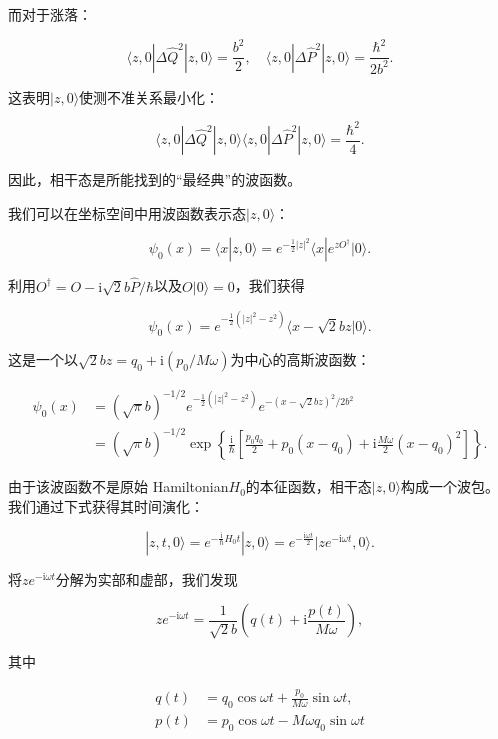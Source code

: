而对于涨落：

\begin{equation}
\langle z,0|\Delta\hat{Q}^{2}|z,0\rangle=\frac{b^{2}}{2},\quad\langle z,0|\Delta\hat{P}^{2}|z,0\rangle=\frac{\hbar^{2}}{2b^{2}}.\label{eq:10.86}
\end{equation}

这表明$|z,0\rangle$使测不准关系最小化：

\[
\langle z,0|\Delta\hat{Q}^{2}|z,0\rangle\langle z,0|\Delta\hat{P}^{2}|z,0\rangle=\frac{\hbar^{2}}{4}.
\]

因此，相干态是所能找到的“最经典”的波函数。

我们可以在坐标空间中用波函数表示态$|z,0\rangle$：

\[
\psi_{0}(x)=\langle x|z,0\rangle=e^{-\frac{1}{2}|z|^{2}}\langle x|e^{zO^{\dagger}}|0\rangle.
\]

利用$O^{\dagger}=O-\mathrm{i}\sqrt{2}b\hat{P}/\hbar$以及$O|0\rangle=0$，我们获得

\[
\psi_{0}(x)=e^{-\frac{1}{2}(|z|^{2}-z^{2})}\langle x-\sqrt{2}bz|0\rangle.
\]

这是一个以$\sqrt{2}bz=q_{0}+\mathrm{i}(p_{0}/M\omega)$为中心的高斯波函数：

\begin{align}
\psi_{0}(x) & =(\sqrt{\pi}b)^{-1/2}e^{-\frac{1}{2}(|z|^{2}-z^{2})}e^{-(x-\sqrt{2}bz)^{2}/2b^{2}}\nonumber \\
 & =(\sqrt{\pi}b)^{-1/2}\exp\left\{ \frac{\mathrm{i}}{\hbar}\left[\frac{p_{0}q_{0}}{2}+p_{0}(x-q_{0})+\mathrm{i}\frac{M\omega}{2}(x-q_{0})^{2}\right]\right\} .\label{eq:10.87}
\end{align}

由于该波函数不是原始 Hamiltonian$H_{0}$的本征函数，相干态$|z,0\rangle$构成一个波包。我们通过下式获得其时间演化：

\[
|z,t,0\rangle=e^{-\frac{\mathrm{i}}{\hbar}H_{0}t}|z,0\rangle=e^{-\frac{\mathrm{i}\omega t}{2}}|ze^{-\mathrm{i}\omega t},0\rangle.
\]

将$ze^{-\mathrm{i}\omega t}$分解为实部和虚部，我们发现

\[
ze^{-\mathrm{i}\omega t}=\frac{1}{\sqrt{2}b}\left(q(t)+\mathrm{i}\frac{p(t)}{M\omega}\right),
\]

其中

\begin{align*}
q(t) & =q_{0}\cos\omega t+\frac{p_{0}}{M\omega}\sin\omega t,\\
p(t) & =p_{0}\cos\omega t-M\omega q_{0}\sin\omega t
\end{align*}

